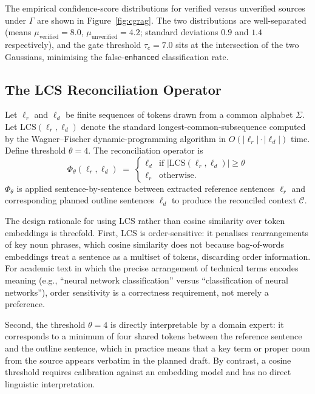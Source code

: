The empirical confidence-score distributions for verified versus unverified sources under
$\Gamma$ are shown in Figure~\ref{fig:cgrag}.
The two distributions are well-separated (means $\mu_{\mathrm{verified}}=8.0$,
$\mu_{\mathrm{unverified}}=4.2$; standard deviations $0.9$ and $1.4$ respectively),
and the gate threshold $\tau_c=7.0$ sits at the intersection of the two Gaussians,
minimising the false-\texttt{enhanced} classification rate.




\subsection{The LCS Reconciliation Operator}

\begin{definition}
\label{def:lcs}
Let $\ell_r$ and $\ell_d$ be finite sequences of tokens drawn from a common alphabet $\Sigma$.
Let $\mathrm{LCS}(\ell_r,\ell_d)$ denote the standard longest-common-subsequence computed
by the Wagner--Fischer dynamic-programming algorithm in $O(|\ell_r|\cdot|\ell_d|)$ time.
Define threshold $\theta=4$.
The reconciliation operator is
\[
  \Phi_\theta(\ell_r,\ell_d) \;=\; \begin{cases}
    \ell_d & \text{if } |\mathrm{LCS}(\ell_r,\ell_d)|\geq\theta \\
    \ell_r & \text{otherwise.}
  \end{cases}
\]
$\Phi_\theta$ is applied sentence-by-sentence between extracted reference sentences $\ell_r$
and corresponding planned outline sentences $\ell_d$ to produce the reconciled context $\mathcal{C}$.
\end{definition}

The design rationale for using LCS rather than cosine similarity over token embeddings
is threefold.
First, LCS is order-sensitive: it penalises rearrangements of key noun phrases,
which cosine similarity does not because bag-of-words embeddings treat a sentence as
a multiset of tokens, discarding order information.
For academic text in which the precise arrangement of technical terms encodes meaning
(e.g., ``neural network classification'' versus ``classification of neural networks''),
order sensitivity is a correctness requirement, not merely a preference.

Second, the threshold $\theta=4$ is directly interpretable by a domain expert:
it corresponds to a minimum of four shared tokens between the reference sentence and
the outline sentence, which in practice means that a key term or proper noun from
the source appears verbatim in the planned draft.
By contrast, a cosine threshold requires calibration against an embedding model and
has no direct linguistic interpretation.

